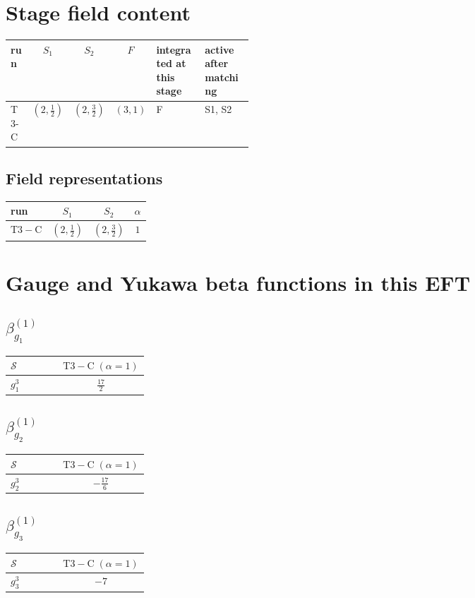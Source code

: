\documentclass[9pt]{article}
\begin{document}
\section*{Stage field content}
\begin{longtable}{@{}lccc p{0.20\linewidth}p{0.20\linewidth}@{}}
\toprule
run & $S_1$ & $S_2$ & $F$ & integrated at this stage & active after matching \\
\midrule
T3-C & $(2,\frac{1}{2})$ & $(2,\frac{3}{2})$ & $(3,1)$ & F & S1, S2 \\
\bottomrule
\end{longtable}
\subsection*{Field representations}
\begin{longtable}{@{}lccc@{}}
\toprule
run & $S_1$ & $S_2$ & $\alpha$ \\
\midrule
$\mathrm{T3-C}$ & $(2,\frac{1}{2})$ & $(2,\frac{3}{2})$ & $1$ \\
\bottomrule
\end{longtable}
\section*{Gauge and Yukawa beta functions in this EFT}
\subsection*{$ \beta_{g_1}^{(1)} $}
\begin{longtable}{@{}p{0.38\linewidth}c@{}}
\toprule
$\mathcal{S}$ & $ \mathrm{T3-C}\;(\alpha=1) $ \\
\midrule
$ g_1^3 $ & $ \frac{17}{2} $ \\
\bottomrule
\end{longtable}
\subsection*{$ \beta_{g_2}^{(1)} $}
\begin{longtable}{@{}p{0.38\linewidth}c@{}}
\toprule
$\mathcal{S}$ & $ \mathrm{T3-C}\;(\alpha=1) $ \\
\midrule
$ g_2^3 $ & $ - \frac{17}{6} $ \\
\bottomrule
\end{longtable}
\subsection*{$ \beta_{g_3}^{(1)} $}
\begin{longtable}{@{}p{0.38\linewidth}c@{}}
\toprule
$\mathcal{S}$ & $ \mathrm{T3-C}\;(\alpha=1) $ \\
\midrule
$ g_3^3 $ & $ -7 $ \\
\bottomrule
\end{longtable}
\end{document}
